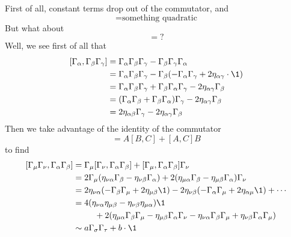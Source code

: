 First of all, constant terms drop out of the commutator, and
\begin{equation}
[\Gamma_{\mu},\Gamma_{\nu}] = \mbox{something quadratic}
\end{equation}
But what about
\begin{equation}
[\Gamma_{\mu}\Gamma_{\nu},\Gamma_{\rho}\Gamma_{\sigma}] = ?
\end{equation}
Well, we see first of all that
\begin{subequations}
\begin{align}
[\Gamma_{\alpha},\Gamma_{\beta}\Gamma_{\gamma}] 
&=\Gamma_{\alpha}\Gamma_{\beta}\Gamma_{\gamma}-\Gamma_{\beta}\Gamma_{\gamma}\Gamma_{\alpha}\\
&=\Gamma_{\alpha}\Gamma_{\beta}\Gamma_{\gamma}-\Gamma_{\beta}(-\Gamma_{\alpha}\Gamma_{\gamma}+2\eta_{\alpha\gamma}\cdot\1)\\
&=\Gamma_{\alpha}\Gamma_{\beta}\Gamma_{\gamma}+\Gamma_{\beta}\Gamma_{\alpha}\Gamma_{\gamma}-2\eta_{\alpha\gamma}\Gamma_{\beta}\\
&=(\Gamma_{\alpha}\Gamma_{\beta}+\Gamma_{\beta}\Gamma_{\alpha})\Gamma_{\gamma}-2\eta_{\alpha\gamma}\Gamma_{\beta}\\
&=2\eta_{\alpha\beta}\Gamma_{\gamma}-2\eta_{\alpha\gamma}\Gamma_{\beta}
\end{align}
\end{subequations}
Then we take advantage of the identity of the commutator
\begin{equation}
[AB,C] = A[B,C] + [A,C]B
\end{equation}
to find
\begin{subequations}
\begin{align}
[\Gamma_{\mu}\Gamma_{\nu},\Gamma_{\alpha}\Gamma_{\beta}] &=
\Gamma_{\mu}[\Gamma_{\nu},\Gamma_{\alpha}\Gamma_{\beta}]+[\Gamma_{\mu},\Gamma_{\alpha}\Gamma_{\beta}]\Gamma_{\nu}\\
&=2\Gamma_{\mu}(\eta_{\nu\alpha}\Gamma_{\beta}-\eta_{\nu\beta}\Gamma_{\alpha})
+2(\eta_{\mu\alpha}\Gamma_{\beta}-\eta_{\mu\beta}\Gamma_{\alpha})\Gamma_{\nu}\\
&=2\eta_{\nu\alpha}(-\Gamma_{\beta}\Gamma_{\mu}+2\eta_{\mu\beta}\1)-2\eta_{\nu\beta}(-\Gamma_{\alpha}\Gamma_{\mu}+2\eta_{\alpha\mu}\1)+\cdots\\
&=4(\eta_{\nu\alpha}\eta_{\mu\beta}-\eta_{\nu\beta}\eta_{\mu\alpha})\1\nonumber\\
&\phantom{=4}\quad+ 2(\eta_{\mu\alpha}\Gamma_{\beta}\Gamma_{\mu}-\eta_{\mu\beta}\Gamma_{\alpha}\Gamma_{\nu}-\eta_{\nu\alpha}\Gamma_{\beta}\Gamma_{\mu}+\eta_{\nu\beta}\Gamma_{\alpha}\Gamma_{\mu})\\
&\sim a\Gamma_{\sigma}\Gamma_{\tau}+b\cdot\1
\end{align}
\end{subequations}
